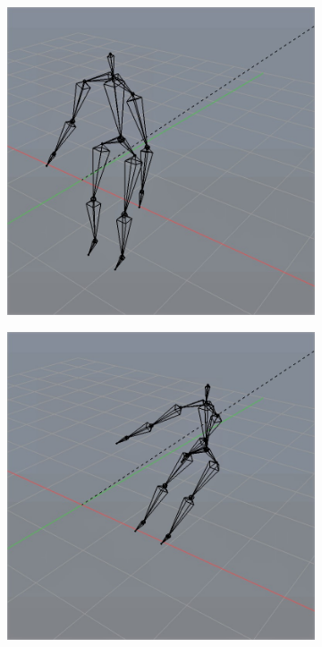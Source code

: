 \documentclass[10pt,twocolumn,letterpaper]{article}
\begin{document}
\begin{figure}
\begin{subfigure}{0.2\textwidth}
        \centering
        \includegraphics[width=.9\linewidth]{capped-cannon-50.jpg}
    \end{subfigure}\begin{subfigure}{0.2\textwidth}
        \centering
        \includegraphics[width=.9\linewidth]{capped-cannon-500.jpg}
    \end{subfigure}\begin{subfigure}{0.2\textwidth}

\end{subfigure}
\end{figure}
\end{document}

